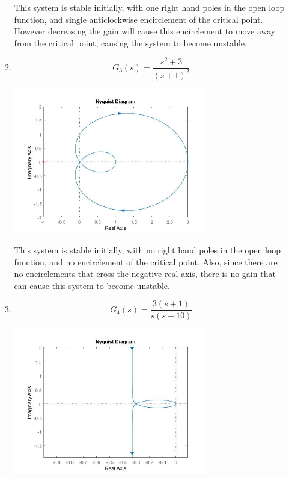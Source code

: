 \documentclass[a4paper,11pt]{article}
\begin{document}
\begin{preview}
\begin{enumerate}
\begin{enumerate}
      This system is stable initially, with one right hand poles in the open loop function, and single anticlockwise encirclement of the critical point. However decreasing the gain will cause this encirclement to move away from the critical point, causing the system to become unstable.\\


      \item $$ G_3 (s) = \frac{ s^2+3 }{ (s+1)^2 } $$

      \begin{center}
        \includegraphics[width=0.7\textwidth]{A_1/1_c.jpg}
      \end{center}

      
      This system is stable initially, with no right hand poles in the open loop function, and no encirclement of the critical point. Also, since there are no encirclements that cross the negative real axis, there is no gain that can cause this system to become unstable.\\

      \item $$ G_4 (s) = \frac{ 3(s+1) }{ s(s-10) } $$

      \begin{center}
        \includegraphics[width=0.7\textwidth]{A_1/1_d.jpg}
      \end{center}


\end{enumerate}
\end{enumerate}
\end{preview}
\end{document}
